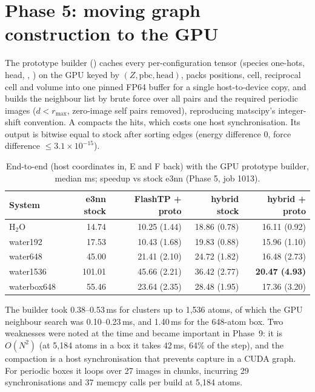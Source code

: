 \section{Phase 5: moving graph construction to the GPU}
\label{sec:graphbuild}

The prototype builder () caches every per-configuration tensor (species one-hots, head, , ) on the GPU keyed by $(Z,\text{pbc},\text{head})$, packs positions, cell, reciprocal cell and volume into one pinned FP64 buffer for a single host-to-device copy, and builds the neighbour list by brute force over all pairs and the required periodic images ($d<r_{\max}$, zero-image self pairs removed), reproducing matscipy's integer-shift convention. A  compacts the hits, which costs one host synchronisation. Its output is bitwise equal to stock after sorting edges (energy difference 0, force difference $\le3.1\times10^{-15}$).

\begin{table}[h]
\centering
\caption{End-to-end (host coordinates in, E and F back) with the GPU prototype builder, median ms; speedup vs stock e3nn (Phase 5, job 1013).}
\label{tab:e2e5}
\small
\begin{tabular}{lrrrr}
\toprule
System & e3nn stock & FlashTP + proto & hybrid stock & hybrid + proto \\
\midrule
H$_2$O & 14.74 & 10.25 (1.44) & 18.86 (0.78) & 16.11 (0.92) \\
water192 & 17.53 & 10.43 (1.68) & 19.83 (0.88) & 15.96 (1.10) \\
water648 & 45.00 & 21.41 (2.10) & 24.72 (1.82) & 16.48 (2.73) \\
water1536 & 101.01 & 45.66 (2.21) & 36.42 (2.77) & \textbf{20.47 (4.93)} \\
waterbox648 & 55.46 & 23.64 (2.35) & 28.48 (1.95) & 17.36 (3.20) \\
\bottomrule
\end{tabular}
\end{table}

The builder took 0.38--0.53\,ms for clusters up to 1{,}536 atoms, of which the GPU neighbour search was 0.10--0.23\,ms, and 1.40\,ms for the 648-atom box. Two weaknesses were noted at the time and became important in Phase~9: it is $O(N^2)$ (at 5{,}184 atoms in a box it takes 42\,ms, 64\% of the step), and the  compaction is a host synchronisation that prevents capture in a CUDA graph. For periodic boxes it loops over 27 images in chunks, incurring 29 synchronisations and 37 memcpy calls per build at 5{,}184 atoms.
